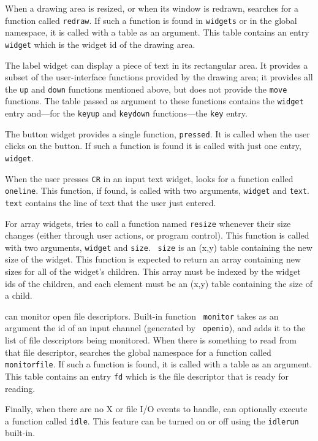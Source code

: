 When a drawing area is resized, or when its window is redrawn, {\LEFTY}
searches for a function called {\tt redraw}. If such a function is found in
{\tt widgets} or in the global namespace, it is called with a table as an
argument. This table contains an entry {\tt widget} which is the widget id
of the drawing area.

The label widget can display a piece of text in its rectangular area.
It provides a subset of the user-interface functions provided by the
drawing area; it provides all the {\tt up} and {\tt down} functions
mentioned above, but does not provide the {\tt move} functions. The table
passed as argument to these functions contains the {\tt widget} entry
and---for the {\tt keyup} and {\tt keydown} functions---the {\tt key}
entry.

The button widget provides a single function, {\tt pressed}. It is called
when the user clicks on the button. If such a function is found it is called
with just one entry, {\tt widget}.

When the user presses {\tt CR} in an input text widget, {\LEFTY} looks for a
function called {\tt oneline}. This function, if found, is called with two
arguments, {\tt widget} and {\tt text}. {\tt text} contains the line of text
that the user just entered.

For array widgets, {\LEFTY} tries to call a function named {\tt resize}
whenever their size changes (either through user actions, or program control).
This function is called with two arguments, {\tt widget} and {\tt size}.  {\tt
size} is an (x,y) table containing the new size of the widget. This function is
expected to return an array containing new sizes for all of the widget's
children. This array must be indexed by the widget ids of the children, and
each element must be an (x,y) table containing the size of a child.

{\LEFTY} can monitor open file descriptors. Built-in function {\tt
monitor} takes as an argument the id of an input channel (generated by {\tt
openio}), and adds it to the list of file descriptors being monitored. When
there is something to read from that file descriptor, {\LEFTY} searches the
global namespace for a function called {\tt monitorfile}. If such a function is
found, it is called with a table as an argument. This table contains an entry
{\tt fd} which is the file descriptor that is ready for reading.

Finally, when there are no X or file I/O events to handle, {\LEFTY} can
optionally execute a function called {\tt idle}. This feature can be turned
on or off using the {\tt idlerun} built-in.

